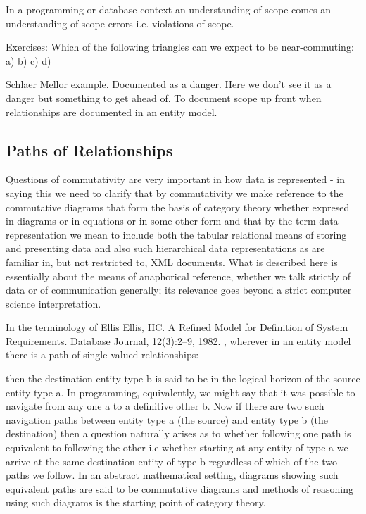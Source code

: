 In a programming or database context an understanding of scope comes an understanding of scope errors i.e. violations of scope. 

Exercises: Which of the following triangles can we expect to be near-commuting:
a) b) c) d)

\begin{noteforfuture}
Schlaer Mellor example. Documented as a danger. Here we don't see it as a danger but something to get ahead of. To document scope up front when relationships are documented in an entity model.
\end{noteforfuture}

\subsection{Paths of Relationships}
Questions of commutativity are very important in how data is represented - in saying this we need to clarify that by commutativity we make reference to the commutative diagrams that form the basis of category theory whether expresed in diagrams or in equations or in some other form and that by the term data representation we mean to include both the tabular relational means of storing and presenting data and also such hierarchical data representations as are familiar in, but not restricted to, XML documents. What is described here is essentially about the means of anaphorical reference, whether we talk strictly of data or of communication generally; its relevance goes beyond a strict computer science interpretation.

In the terminology of Ellis Ellis, HC. A Refined Model for Definition of System Requirements. Database Journal, 12(3):2--9, 1982. , wherever in an entity model there is a path of single-valued relationships:

\begin{center}

\end{center}
then the destination entity type b is said to be in the logical horizon of the source entity type a. In programming, equivalently, we might say that it was possible to navigate from any one a to a definitive other b. Now if there are two such navigation paths between entity type a (the source) and entity type b (the destination) then a question naturally arises as to whether following one path is equivalent to following the other i.e whether starting at any entity of type a we arrive at the same destination entity of type b regardless of which of the two paths we follow. In an abstract mathematical setting, diagrams showing such equivalent paths are said to be commutative diagrams and methods of reasoning using such diagrams is the starting point of category theory.

